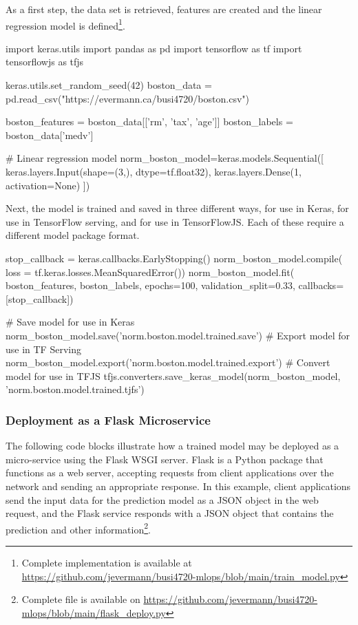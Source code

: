 As a first step, the data set is retrieved, features are created and the linear regression model is defined\footnote{
Complete implementation is available at \url{https://github.com/jevermann/busi4720-mlops/blob/main/train_model.py}}. \\

\begin{samepage}
\begin{pythoncode}
import keras.utils
import pandas as pd
import tensorflow as tf
import tensorflowjs as tfjs

keras.utils.set_random_seed(42)
boston_data = pd.read_csv("https://evermann.ca/busi4720/boston.csv")

boston_features = boston_data[['rm', 'tax', 'age']]
boston_labels = boston_data['medv']

# Linear regression model
norm_boston_model=keras.models.Sequential([
    keras.layers.Input(shape=(3,), dtype=tf.float32),
    keras.layers.Dense(1, activation=None) ])
\end{pythoncode}
\end{samepage}

Next, the model is trained and saved in three different ways, for use in Keras, for use in TensorFlow serving, and for use in TensorFlowJS. Each of these require a different model package format.

\begin{samepage}
\begin{pythoncode}
stop_callback = keras.callbacks.EarlyStopping()
norm_boston_model.compile(
    loss = tf.keras.losses.MeanSquaredError())
norm_boston_model.fit(
    boston_features, boston_labels,
    epochs=100, validation_split=0.33,
    callbacks=[stop_callback])

# Save model for use in Keras
norm_boston_model.save('norm.boston.model.trained.save')
# Export model for use in TF Serving
norm_boston_model.export('norm.boston.model.trained.export')
# Convert model for use in TFJS
tfjs.converters.save_keras_model(norm_boston_model,
    'norm.boston.model.trained.tjfs')
\end{pythoncode}
\end{samepage}

\subsubsection*{Deployment as a Flask Microservice}

The following code blocks illustrate how a trained model may be deployed as a micro-service using the Flask WSGI server. Flask is a Python package that functions as a web server, accepting requests from client applications over the network and sending an appropriate response. In this example, client applications send the input data for the prediction model as a JSON object in the web request, and the Flask service responds with a JSON object that contains the prediction and other information\footnote{Complete file is available on \url{https://github.com/jevermann/busi4720-mlops/blob/main/flask_deploy.py}}.

